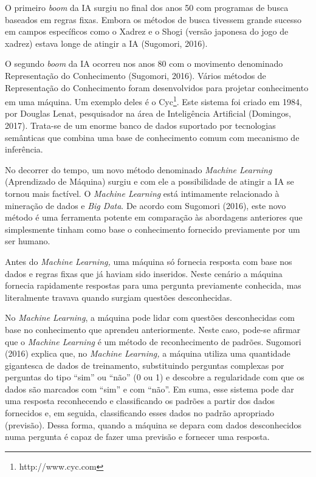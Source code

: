 O primeiro \emph{boom} da IA surgiu no final dos anos 50 com programas
de busca baseados em regras fixas. Embora os métodos de busca tivessem
grande sucesso em campos específicos como o Xadrez e o Shogi (versão
japonesa do jogo de xadrez) estava longe de atingir a IA (Sugomori,
2016).

O segundo \emph{boom} da IA ocorreu nos anos 80 com o movimento
denominado Representação do Conhecimento (Sugomori, 2016). Vários
métodos de Representação do Conhecimento foram desenvolvidos para
projetar conhecimento em uma máquina. Um exemplo deles é o Cyc\footnote{http://www.cyc.com}.
Este sistema foi criado em 1984, por Douglas Lenat, pesquisador na área
de Inteligência Artificial (Domingos, 2017). Trata-se de um enorme banco
de dados suportado por tecnologias semânticas que combina uma base de
conhecimento comum com mecanismo de inferência.

No decorrer do tempo, um novo método denominado \emph{Machine Learning}
(Aprendizado de Máquina) surgiu e com ele a possibilidade de atingir a
IA se tornou mais factível. O \emph{Machine Learning} está intimamente
relacionado à mineração de dados e \emph{Big Data}. De acordo com
Sugomori (2016), este novo método é uma ferramenta potente em comparação
às abordagens anteriores que simplesmente tinham como base o
conhecimento fornecido previamente por um ser humano.

Antes do \emph{Machine Learning,} uma máquina só fornecia resposta com
base nos dados e regras fixas que já haviam sido inseridos. Neste
cenário a máquina fornecia rapidamente respostas para uma pergunta
previamente conhecida, mas literalmente travava quando surgiam questões
desconhecidas.

No \emph{Machine Learning}, a máquina pode lidar com questões
desconhecidas com base no conhecimento que aprendeu anteriormente. Neste
caso, pode-se afirmar que o \emph{Machine Learning} é um método de
reconhecimento de padrões. Sugomori (2016) explica que, no \emph{Machine
Learning,} a máquina utiliza uma quantidade gigantesca de dados de
treinamento, substituindo perguntas complexas por perguntas do tipo
``sim'' ou ``não'' (0 ou 1) e descobre a regularidade com que os dados
são marcados com ``sim'' e com ``não''. Em suma, esse sistema pode dar
uma resposta reconhecendo e classificando os padrões a partir dos dados
fornecidos e, em seguida, classificando esses dados no padrão apropriado
(previsão). Dessa forma, quando a máquina se depara com dados
desconhecidos numa pergunta é capaz de fazer uma previsão e fornecer uma
resposta.

